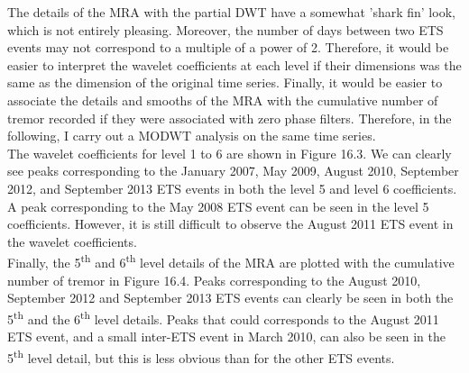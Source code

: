 \documentclass[main.tex]{subfiles}
\begin{document}
The details of the MRA with the partial DWT have a somewhat 'shark fin' look, which is not entirely pleasing. Moreover, the number of days between two ETS events may not correspond to a multiple of a power of 2. Therefore, it would be easier to interpret the wavelet coefficients at each level if their dimensions was the same as the dimension of the original time series. Finally, it would be easier to associate the details and smooths of the MRA with the cumulative number of tremor recorded if they were associated with zero phase filters. Therefore, in the following, I carry out a MODWT analysis on the same time series. \\

The wavelet coefficients for level 1 to 6 are shown in Figure 16.3. We can clearly see peaks corresponding to the January 2007, May 2009, August 2010, September 2012, and September 2013 ETS events in both the level 5 and level 6 coefficients. A peak corresponding to the May 2008 ETS event can be seen in the level 5 coefficients. However, it is still difficult to observe the August 2011 ETS event in the wavelet coefficients. \\

Finally, the 5\textsuperscript{th} and 6\textsuperscript{th} level details of the MRA are plotted with the cumulative number of tremor in Figure 16.4. Peaks corresponding to the August 2010, September 2012 and September 2013 ETS events can clearly be seen in both the 5\textsuperscript{th} and the 6\textsuperscript{th} level details. Peaks that could corresponds to the August 2011 ETS event, and a small inter-ETS event in March 2010, can also be seen in the 5\textsuperscript{th} level detail, but this is less obvious than for the other ETS events.
\end{document}
